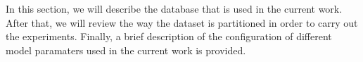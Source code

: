 In this section, we will describe the database that is used in the current work.
After that, we will review the way the dataset is partitioned in order to carry out the experiments.
Finally, a brief description of the configuration of different model paramaters used in the current
work is provided.
